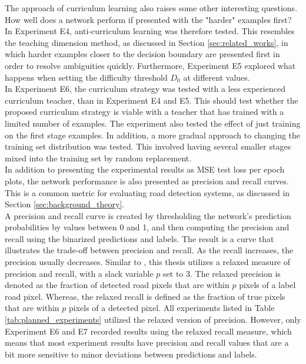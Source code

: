 The approach of curriculum learning also raises some other interesting questions. How well does a network perform if presented with the "harder" examples first? In Experiment E4, anti-curriculum learning was therefore tested. This resembles the teaching dimension method, as discussed in Section \ref{sec:related_works}, in which harder examples closer to the decision boundary are presented first in order to resolve ambiguities quickly. Furthermore, Experiment E5 explored what happens when setting the difficulty threshold $D_0$ at different values.\\

In Experiment E6, the curriculum strategy was tested with a less experienced curriculum teacher, than in Experiment E4 and E5. This should test whether the proposed curriculum strategy is viable with a teacher that has trained with a limited number of examples. The experiment also tested the effect of just training on the first stage examples. In addition, a more gradual approach to changing the training set distribution was tested. This involved having several smaller stages mixed into the training set by random replacement.\\

In addition to presenting the experimental results as \ac{MSE} test loss per epoch plots, the network performance is also presented as precision and recall curves. This is a common metric for evaluating road detection systems, as discussed in Section \ref{sec:background_theory}.\\

A precision and recall curve is created by thresholding the network's prediction probabilities by values between 0 and 1, and then computing the precision and recall using the binarized predictions and labels. The result is a curve that illustrates the trade-off between precision and recall. As the recall increases, the precision usually decreases. Similar to \citep{Mnih_aerial_images_noisy}, this thesis utilizes a relaxed measure of precision and recall, with a slack variable $p$ set to 3. The relaxed precision is denoted as the fraction of detected road pixels that are within $p$ pixels of a label road pixel. Whereas, the relaxed recall is defined as the fraction of true pixels that are within $p$ pixels of a detected pixel. All experiments listed in Table \ref{tab:planned_experiments} utilized the relaxed version of precision. However, only Experiment E6 and E7 recorded results using the relaxed recall measure, which means that most experiment results have precision and recall values that are a bit more sensitive to minor deviations between predictions and labels.\\

